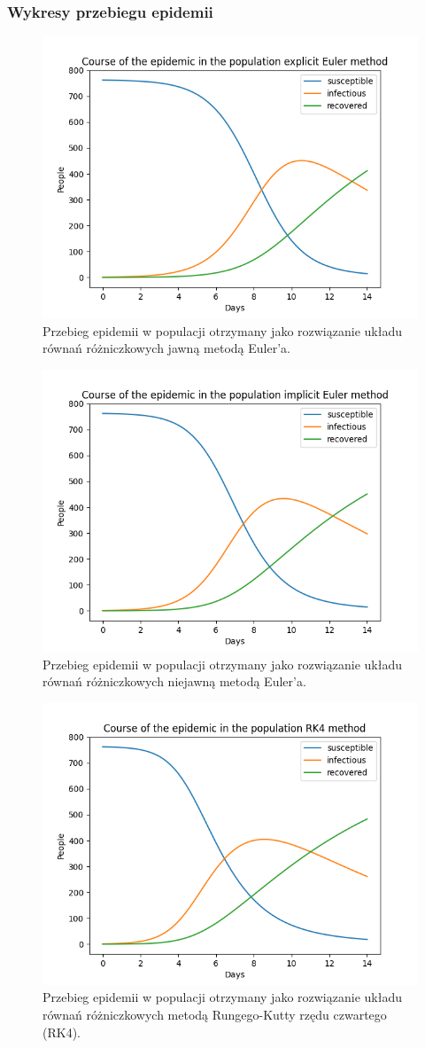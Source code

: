 \documentclass[11pt, leqno]{scrartcl}
\begin{document}
    \subsubsection{Wykresy przebiegu epidemii}
    \begin{figure}[H]
        \centering
        \includegraphics[width=0.7\linewidth]{explicit_euler.png}
        \caption{Przebieg epidemii w populacji otrzymany
            jako rozwiązanie układu równań różniczkowych jawną
            metodą Euler'a.}
    \end{figure}
    \begin{figure}[H]
        \centering
        \includegraphics[width=0.7\linewidth]{implicit_euler.png}
        \caption{Przebieg epidemii w populacji otrzymany
            jako rozwiązanie układu równań różniczkowych niejawną
            metodą Euler'a.}
    \end{figure}
    \begin{figure}[H]
        \centering
        \includegraphics[width=0.7\linewidth]{RK4.png}
        \caption{Przebieg epidemii w populacji otrzymany
            jako rozwiązanie układu równań różniczkowych metodą
            Rungego-Kutty rzędu czwartego (RK4).}
    \end{figure}
\end{document}
